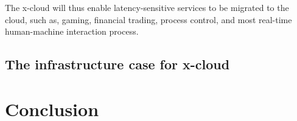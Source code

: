 \documentclass[conference]{IEEEtran}
\newcommand{\xcloud}{x-cloud }
\begin{document}
The \xcloud will thus enable latency-sensitive services to be migrated to the cloud, such as, gaming, financial trading, process control, and most real-time human-machine interaction process.

\subsection{The infrastructure case for \xcloud}


\section{Conclusion}




\end{document}
